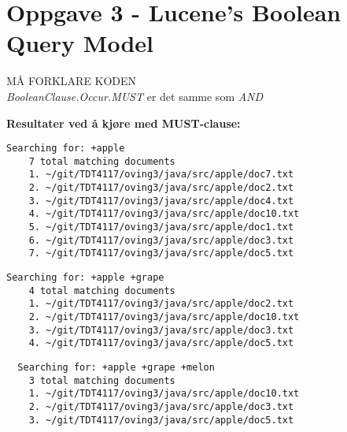 \lstset{language=Java,
numberstyle=\footnotesize,
basicstyle=\ttfamily\footnotesize,
frame=shadowbox,
breaklines=true}

\section*{Oppgave 3 - Lucene's Boolean Query Model}

MÅ FORKLARE KODEN\\

\noindent \textit{BooleanClause.Occur.MUST} er det samme som \textit{AND}

\vspace{5mm}
\noindent \textbf{Resultater ved å kjøre med MUST-clause:}


\begin{lstlisting}[frame=single]
  Searching for: +apple 
	7 total matching documents 
	1. ~/git/TDT4117/oving3/java/src/apple/doc7.txt 
	2. ~/git/TDT4117/oving3/java/src/apple/doc2.txt 
	3. ~/git/TDT4117/oving3/java/src/apple/doc4.txt 
	4. ~/git/TDT4117/oving3/java/src/apple/doc10.txt
	5. ~/git/TDT4117/oving3/java/src/apple/doc1.txt 
	6. ~/git/TDT4117/oving3/java/src/apple/doc3.txt 
	7. ~/git/TDT4117/oving3/java/src/apple/doc5.txt 
\end{lstlisting}


\begin{lstlisting}[frame=single]
  Searching for: +apple +grape
	4 total matching documents
	1. ~/git/TDT4117/oving3/java/src/apple/doc2.txt 
	2. ~/git/TDT4117/oving3/java/src/apple/doc10.txt 
	3. ~/git/TDT4117/oving3/java/src/apple/doc3.txt 
	4. ~/git/TDT4117/oving3/java/src/apple/doc5.txt 
\end{lstlisting}


\begin{lstlisting}
  Searching for: +apple +grape +melon 
	3 total matching documents 
	1. ~/git/TDT4117/oving3/java/src/apple/doc10.txt 
	2. ~/git/TDT4117/oving3/java/src/apple/doc3.txt 
	3. ~/git/TDT4117/oving3/java/src/apple/doc5.txt
\end{lstlisting}

\noindent   